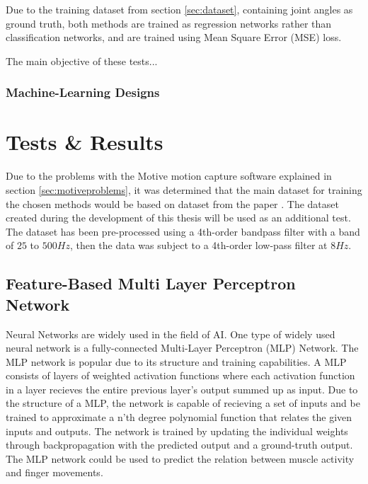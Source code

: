 \documentclass[../main.tex]{subfiles}
\begin{document}
Due to the training dataset \cite{kinmusdataset} from section \ref{sec:dataset},  containing joint angles as ground truth, both methods are trained as regression networks rather than classification networks, and are trained using Mean Square Error (MSE) loss.

The main objective of these tests...

\subsubsection{Machine-Learning Designs}



\section{Tests \& Results}

Due to the problems with the Motive motion capture software explained in section \ref{sec:motiveproblems}, it was determined that the main dataset for training the chosen methods would be based on dataset \cite{kinmusdataset} from the paper \cite{jarque2019}.
The dataset created during the development of this thesis will be used as an additional test. 
The dataset has been pre-processed using a 4th-order bandpass filter with a band of  $25$ to $500Hz$, then the data was subject to a 4th-order low-pass filter at $8 Hz$.


\subsection{Feature-Based Multi Layer Perceptron Network}

Neural Networks are widely used in the field of AI.
One type of widely used neural network is a fully-connected Multi-Layer Perceptron (MLP) Network.
The MLP network is popular due to its structure and training capabilities.
A MLP consists of layers of weighted activation functions where each activation function in a layer recieves the entire previous layer's output summed up as input.
Due to the structure of a MLP, the network is capable of recieving a set of inputs and be trained to approximate a n'th degree polynomial function that relates the given inputs and outputs.
The network is trained by updating the individual weights through backpropagation with the predicted output and a ground-truth output.
The MLP network could be used to predict the relation between muscle activity and finger movements.
\end{document}
